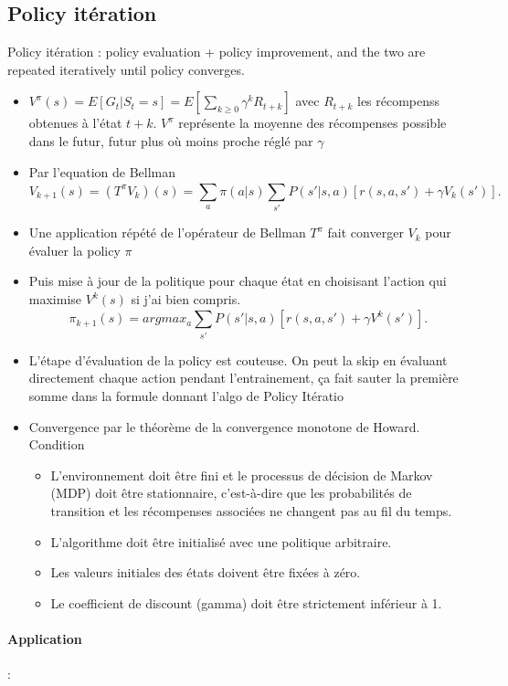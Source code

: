 \documentclass{article}
\theoremstyle{plain}%
\theoremstyle{definition}
\theoremstyle{remark}
\begin{document}
\subsection{Policy itération}
Policy itération : policy evaluation + policy improvement, and the two are repeated iteratively until policy converges.
\begin{itemize}
    \item $ V^\pi (s) = E[G_t | S_t = s] = E[ \sum_{k \geq 0}^{} \gamma ^k R_{t+k}] $ avec $ R_{t+k} $ les récompenss obtenues à l'état $ t+k $. $ V^\pi $ représente la moyenne des récompenses possible dans le futur, futur plus où moins proche réglé par $ \gamma  $ 
    \item Par l'equation de Bellman
    \[
        V_{k+1}(s) = (T^\pi V_k)(s) = \sum_{a}^{}\pi (a | s) \sum_{s'}^{}P(s' | s, a) [r(s, a, s') + \gamma V_k(s')]
    .\]
    \item Une application répété de l'opérateur de Bellman $ T^\pi  $ fait converger $ V_k $ pour évaluer la policy $ \pi  $ 
    \item Puis mise à jour de la politique pour chaque état en choisisant l'action qui maximise $ V^k(s) $ si j'ai bien compris. 
    \[
        \pi _{k+1}(s) = argmax_a \sum_{s'}^{} P(s' | s, a) [ r(s, a, s') + \gamma V^{k}(s')]
    .\]
    \item L'étape d'évaluation de la policy est couteuse. On peut la skip en évaluant directement chaque action pendant l'entrainement, ça fait sauter la première somme dans la formule donnant l'algo de Policy Itératio
    \item Convergence par le théorème de la convergence monotone de Howard. Condition \begin{itemize}
        \item L'environnement doit être fini et le processus de décision de Markov (MDP) doit être stationnaire, c'est-à-dire que les probabilités de transition et les récompenses associées ne changent pas au fil du temps.
        \item L'algorithme doit être initialisé avec une politique arbitraire.
        \item Les valeurs initiales des états doivent être fixées à zéro.
        \item Le coefficient de discount (gamma) doit être strictement inférieur à 1.
    \end{itemize}
\end{itemize}


\paragraph*{Application} : 
\end{document}
